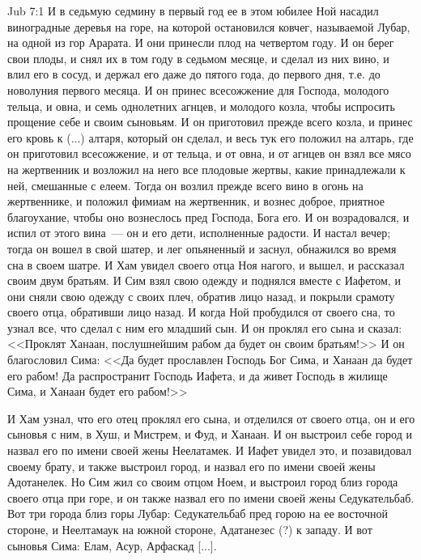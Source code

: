 \vs Jub 7:1
И в седьмую седмину в первый год ее в этом
юбилее Ной насадил виноградные деревья на горе,
на которой остановился ковчег, называемой Лубар,
на одной из гор Арарата. И они принесли плод на
четвертом году. И он берег свои плоды, и снял их в
том году в седьмом месяце, и сделал из них вино, и
влил его в сосуд, и держал его даже до пятого года,
до первого дня, т.е. до новолуния первого месяца.
И он принес всесожжение для Господа, молодого
тельца, и овна, и семь однолетних агнцев, и
молодого козла, чтобы испросить прощение себе и
своим сыновьям. И он приготовил прежде всего
козла, и принес его кровь к (...) алтаря, который он
сделал, и весь тук его положил на алтарь, где он
приготовил всесожжение, и от тельца, и от овна, и
от агнцев он взял все мясо на жертвенник и
возложил на него все плодовые жертвы, какие
принадлежали к ней, смешанные с елеем. Тогда он
возлил прежде всего вино в огонь на жертвеннике,
и положил фимиам на жертвенник, и вознес доброе,
приятное благоухание, чтобы оно вознеслось пред
Господа, Бога его. И он возрадовался, и испил от
этого вина~--- он и его дети, исполненные радости. И
настал вечер; тогда он вошел в свой шатер, и лег
опьяненный и заснул, обнажился во время сна в
своем шатре. И Хам увидел своего отца Ноя нагого,
и вышел, и рассказал своим двум братьям. И Сим
взял свою одежду и поднялся вместе с Иафетом, и
они сняли свою одежду с своих плеч, обратив лицо
назад, и покрыли срамоту своего отца, обративши лицо
назад. И когда Ной пробудился от своего сна, то
узнал все, что сделал с ним его младший сын. И он
проклял его сына и сказал: <<Проклят Ханаан,
послушнейшим рабом да будет он своим братьям!>>
И он благословил Сима: <<Да будет прославлен
Господь Бог Сима, и Ханаан да будет его рабом! Да
распространит Господь Иафета, и да живет Господь
в жилище Сима, и Ханаан будет его рабом!>>

И Хам узнал, что его отец проклял его сына, и
отделился от своего отца, он и его сыновья с ним, в
Хуш, и Мистрем, и Фуд, и Ханаан. И он выстроил себе
город и назвал его по имени своей жены
Неелатамек. И Иафет увидел это, и позавидовал
своему брату, и также выстроил город, и назвал его
по имени своей жены Адотанелек. Но Сим жил со
своим отцом Ноем, и выстроил город близ города
своего отца при горе, и он также назвал его по
имени своей жены Седукательбаб. Вот три города
близ горы Лубар: Седукательбаб пред горою на ее
восточной стороне, и Неелтамаук на южной стороне,
Адатанезес (?) к западу. И вот сыновья Сима: Елам,
Асур, Арфаскад [...].

